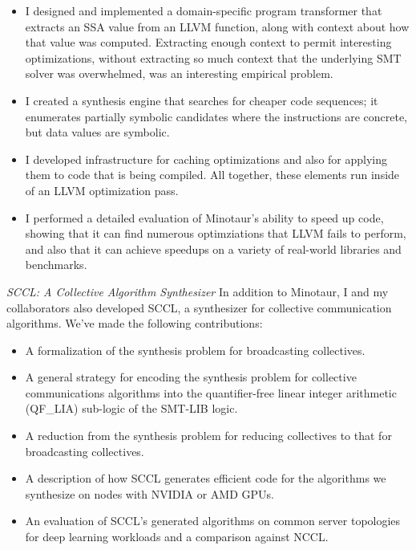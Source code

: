 \begin{itemize}
    \item I designed and implemented a domain-specific program
    transformer that extracts an SSA value from an LLVM function,
    along with context about how that value was computed.
    Extracting enough context to permit interesting optimizations,
    without extracting so much context that the underlying SMT
    solver was overwhelmed, was an interesting empirical problem.

    \item I created a synthesis engine that searches for cheaper code
    sequences; it enumerates partially symbolic candidates where the
    instructions are concrete, but data values are symbolic.
    \item I developed infrastructure for caching optimizations and also
    for applying them to code that is being compiled.
    All together, these elements run inside of an LLVM optimization pass.
    \item I performed a detailed evaluation of Minotaur's ability to
    speed up code, showing that it can find numerous optimziations that
    LLVM fails to perform, and also that it can achieve speedups on a
    variety of real-world libraries and benchmarks.
\end{itemize}

\emph{SCCL: A Collective Algorithm Synthesizer} In addition to
Minotaur, I and my collaborators also developed SCCL, a synthesizer
for collective communication algorithms. We've made the following
contributions:

\begin{itemize}
\item A formalization of the synthesis problem for broadcasting
collectives.

\item A general strategy for encoding the synthesis problem for
collective communications algorithms into the quantifier-free linear
integer arithmetic (QF\_LIA) sub-logic of the SMT-LIB logic.

\item A reduction from the synthesis problem for reducing collectives
to that for broadcasting collectives.

\item A description of how SCCL generates efficient code for the
algorithms we synthesize on nodes with NVIDIA or AMD GPUs.

\item An evaluation of SCCL's generated algorithms on common server
topologies for deep learning workloads and a comparison against NCCL.

\end{itemize}


